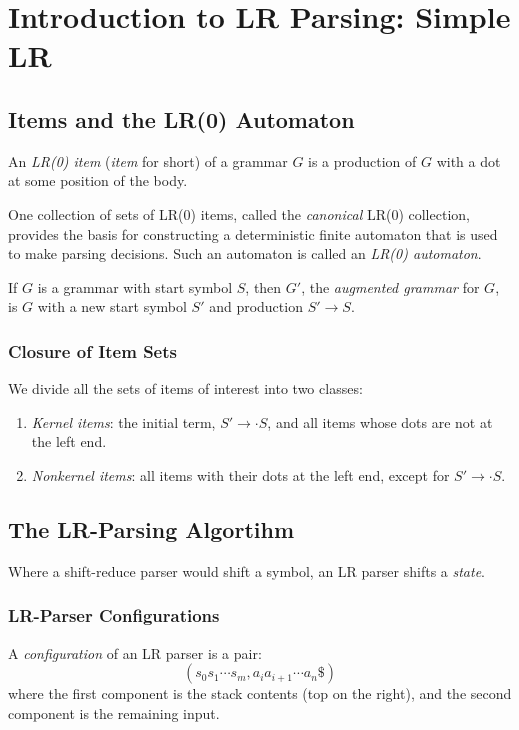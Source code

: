 \documentclass[12pt,a4paper,twoside,openany]{book}
\begin{document}
\section{Introduction to LR Parsing: Simple LR}
\subsection{Items and the LR(0) Automaton}

An \textit{LR(0) item} (\textit{item} for short) of a grammar $G$ is a production of $G$ with a dot at some position of the body.

One collection of sets of LR(0) items, called the \textit{canonical} LR(0) collection, provides the basis for constructing a deterministic finite automaton that is used to make parsing decisions. Such an automaton is called an \textit{LR(0) automaton}.

If $G$ is a grammar with start symbol $S$, then $G'$, the \textit{augmented grammar} for $G$, is $G$ with a new start symbol $S'$ and production $S'\rightarrow S$.

\subsubsection{Closure of Item Sets}

We divide all the sets of items of interest into two classes:
\begin{enumerate}
    \item \textit{Kernel items}: the initial term, $S'\rightarrow\cdot S$, and all items whose dots are not at the left end.
    \item \textit{Nonkernel items}: all items with their dots at the left end, except for $S'\rightarrow\cdot S$.
\end{enumerate}

\subsection{The LR-Parsing Algortihm}

Where a shift-reduce parser would shift a symbol, an LR parser shifts a \textit{state}.

\subsubsection{LR-Parser Configurations}

A \textit{configuration} of an LR parser is a pair: $$(s_0s_1\cdots s_m,a_ia_{i+1}\cdots a_n\$)$$ where the first component is the stack contents (top on the right), and the second component is the remaining input.
\end{document}
